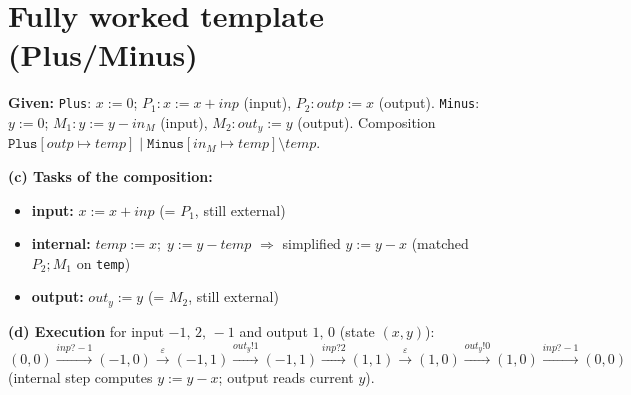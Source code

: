 \section{Fully worked template (Plus/Minus)}
\textbf{Given:} \texttt{Plus}: $x{:=}0$;\; $P_1\!: x{:=}x{+}inp$ (input), $P_2\!: outp{:=}x$ (output). \quad
\texttt{Minus}: $y{:=}0$;\; $M_1\!: y{:=}y{-}in_M$ (input), $M_2\!: out_y{:=}y$ (output). \quad
Composition $\texttt{Plus}[outp\mapsto temp]\;|\;\texttt{Minus}[in_M\mapsto temp]\setminus temp$.

\textbf{(c) Tasks of the composition:}
\begin{itemize}
  \item \textbf{input:} $x := x + inp$ \hfill (= $P_1$, still external)
  \item \textbf{internal:} $temp := x;\; y := y - temp$ \;$\Rightarrow$\; simplified $y := y - x$ \hfill (matched $P_2;M_1$ on \texttt{temp})
  \item \textbf{output:} $out_y := y$ \hfill (= $M_2$, still external)
\end{itemize}

\textbf{(d) Execution} for input $-1,\,2,\,-1$ and output $1,\,0$ (state $(x,y)$):
$$(0,0)\xrightarrow{inp?-1}(-1,0)\xrightarrow{\varepsilon}(-1,1)\xrightarrow{out_y!1}(-1,1)\xrightarrow{inp?2}(1,1)\xrightarrow{\varepsilon}(1,0)\xrightarrow{out_y!0}(1,0)\xrightarrow{inp?-1}(0,0)$$
(internal step computes $y:=y-x$; output reads current $y$).

